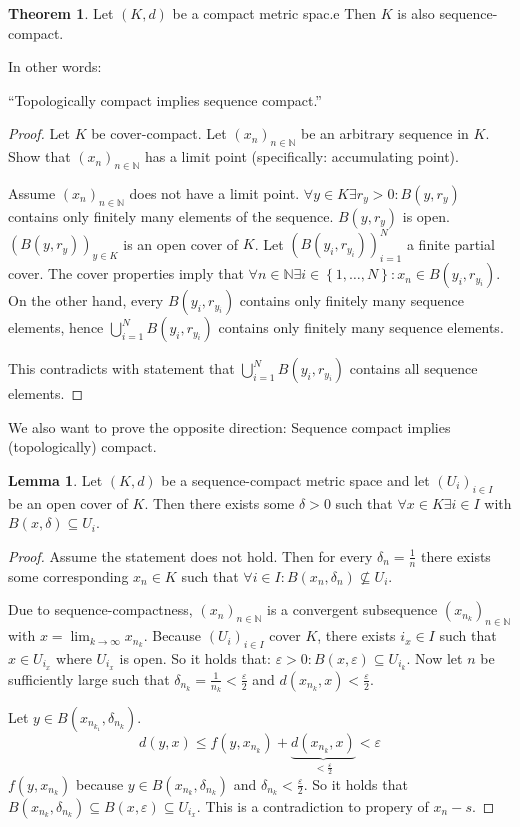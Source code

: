 \documentclass[a4paper,landscape,twocolumn]{article}
\theoremstyle{definition}
\newtheorem{theorem}{Theorem}
\newtheorem{lemma}{Lemma}
\newcommand\set[1]{\left\{#1\right\}}
\begin{document}
\begin{theorem}
  Let $(K,d)$ be a compact metric spac.e Then $K$ is also
  sequence-compact.

  In other words:
  \begin{center} \enquote{Topologically compact implies sequence compact.} \end{center}
\end{theorem}
\begin{proof}
  Let $K$ be cover-compact.
  Let $(x_n)_{n \in \mathbb N}$ be an arbitrary sequence in $K$.
  Show that $(x_n)_{n \in \mathbb N}$ has a limit point (specifically: accumulating point).

  Assume $(x_n)_{n \in \mathbb N}$ does not have a limit point.
  $\forall y \in K \exists r_y > 0: B(y, r_y)$ contains only finitely many elements of the sequence.
  $B(y, r_y)$ is open.
  $(B(y, r_y))_{y \in K}$ is an open cover of $K$. Let $(B(y_i, r_{y_i}))_{i=1}^N$ a finite partial cover.
  The cover properties imply that $\forall n \in \mathbb N \exists i \in \set{1,\ldots,N}: x_n \in B(y_i, r_{y_i})$.
  On the other hand, every $B(y_i, r_{y_i})$ contains only finitely many sequence elements, hence
  $\bigcup_{i=1}^N B(y_i, r_{y_i})$ contains only finitely many sequence elements.

  This contradicts with statement that $\bigcup_{i=1}^N B(y_i, r_{y_i})$ contains all sequence elements.
\end{proof}

We also want to prove the opposite direction:
Sequence compact implies (topologically) compact.

\begin{lemma}
  Let $(K, d)$ be a sequence-compact metric space and let $(U_i)_{i \in I}$ be an open cover of $K$.
  Then there exists some $\delta > 0$ such that $\forall x \in K \exists i \in I$ with
  $B(x,\delta) \subseteq U_i$.
\end{lemma}
\begin{proof}
  Assume the statement does not hold. Then for every $\delta_n = \frac1n$ there exists
  some corresponding $x_n \in K$ such that $\forall i \in I: B(x_n, \delta_n) \not\subseteq U_i$.

  Due to sequence-compactness, $(x_n)_{n \in \mathbb N}$ is a convergent subsequence
  $(x_{n_k})_{n \in \mathbb N}$ with $x = \lim_{k\to\infty} x_{n_k}$.
  Because $(U_i)_{i \in I}$ cover $K$, there exists $i_x \in I$ such that $x \in U_{i_x}$
  where $U_{i_x}$ is open.
  So it holds that: $\varepsilon > 0: B(x, \varepsilon) \subseteq U_{i_k}$.
  Now let $n$ be sufficiently large such that $\delta_{n_k} = \frac{1}{n_k} < \frac{\varepsilon}{2}$
  and $d(x_{n_k}, x) < \frac{\varepsilon}{2}$.

  Let $y \in B(x_{n_{k_1}}, \delta_{n_k})$.
  \[ d(y, x) \leq f(y, x_{n_k}) + \underbrace{d(x_{n_k}, x)}_{< \frac\varepsilon2} < \varepsilon \]
  $f(y, x_{n_k})$ because $y \in B(x_{n_k}, \delta_{n_k})$ and $\delta_{n_k} < \frac{\varepsilon}{2}$.
  So it holds that $B(x_{n_k}, \delta_{n_k}) \subseteq B(x, \varepsilon) \subseteq U_{i_x}$.
  This is a contradiction to propery of $x_n - s$.
\end{proof}
\end{document}
